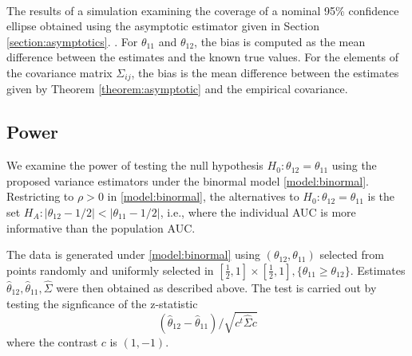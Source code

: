 \documentclass[12pt]{article}
\DeclareMathOperator{\AUC}{AUC}
\newcommand{\cind}{\perp \!\!\! \perp}
\newcommand{\aucindiv}{\theta_{11}}%
\newcommand{\aucpop}{\theta_{12}}%
\newcommand{\aucindivhat}{\hat{\theta}_{11}}%
\newcommand{\aucpophat}{\hat{\theta}_{12}}%
\newcommand{\comment}[1]{
  \iftoggle{commenttoggle}{
    {\normalsize{\color{red}{ #1}}\normalsize}
  }
  {}
}
\begin{document}
\begin{table}
  \\
    \caption{The results of a simulation examining the coverage of a nominal 95\% confidence ellipse obtained using the asymptotic estimator given in Section \ref{section:asymptotics}.\comment{make conssitent order of theta11 vs theta12 columns}. For $\aucindiv$ and $\aucpop$, the bias is computed as the mean difference between the estimates and the known true values. For the elements of the covariance matrix $\Sigma_{ij}$, the bias is the mean difference between the estimates given by Theorem \ref{theorem:asymptotic}   and the empirical covariance.}
    \label{table:1}
\end{table}

%   



\subsection{Power}\label{section:simulation:power}

We examine the power of testing the null hypothesis
$H_0:\aucpop=\aucindiv$ using the proposed variance estimators under
the binormal model \eqref{model:binormal}. Restricting to $\rho>0$ in
\eqref{model:binormal}, the alternatives to $H_0:\aucpop=\aucindiv$ is
the set $H_A:|\aucpop-1/2|<|\aucindiv-1/2|$, i.e., where the
individual AUC is more informative than the population AUC.

The data is generated under \eqref{model:binormal} using
$(\aucpop,\aucindiv)$ selected from points randomly and uniformly selected in
$[\frac{1}{2},1]\times[\frac{1}{2},1], \{\aucindiv\ge\aucpop\}$. Estimates
$\aucpophat,\aucindivhat,\hat\Sigma$ were then obtained as described
above. The test is carried out by testing the signficance of the
z-statistic
$$
(\aucpophat-\aucindivhat) /
\sqrt{c^t\hat\Sigma c}
$$
where the contrast $c$ is $(1,-1)$.
\end{document}
